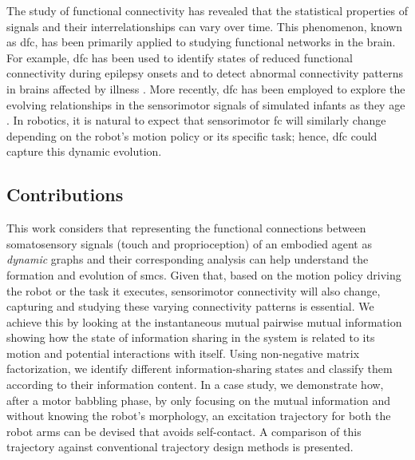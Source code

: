 The study of functional connectivity has revealed that the statistical properties of signals and their interrelationships can vary over time. This phenomenon, known as \ac{dfc}, has been primarily applied to studying functional networks in the brain. For example, \ac{dfc} has been used to identify states of reduced functional connectivity during epilepsy onsets \cite{Christiaen2020Dynamicfunctionalconnectivity} and to detect abnormal connectivity patterns in brains affected by illness \cite{Zhou2020Earlychildhooddevelopmental}. More recently, \ac{dfc} has been employed to explore the evolving relationships in the sensorimotor signals of simulated infants as they age \cite{Kanazawa2023Openendedmovements}. In robotics, it is natural to expect that sensorimotor \ac{fc} will similarly change depending on the robot's motion policy or its specific task; hence, \ac{dfc} could capture this dynamic evolution.

\subsection{Contributions}
This work considers that representing the functional connections between somatosensory signals (touch and proprioception) of an embodied agent as \emph{dynamic} graphs and their corresponding analysis can help understand the formation and evolution of \acp{smc}. Given that, based on the motion policy driving the robot or the task it executes, sensorimotor connectivity will also change, capturing and studying these varying connectivity patterns is essential. We achieve this by looking at the instantaneous mutual pairwise mutual information showing how the state of information sharing in the system is related to its motion and potential interactions with itself. Using non-negative matrix factorization, we identify different information-sharing states and classify them according to their information content. In a case study, we demonstrate how, after a motor babbling phase, by only focusing on the mutual information and without knowing the robot's morphology, an excitation trajectory for both the robot arms can be devised that avoids self-contact. A comparison of this trajectory against conventional trajectory design methods is presented.

